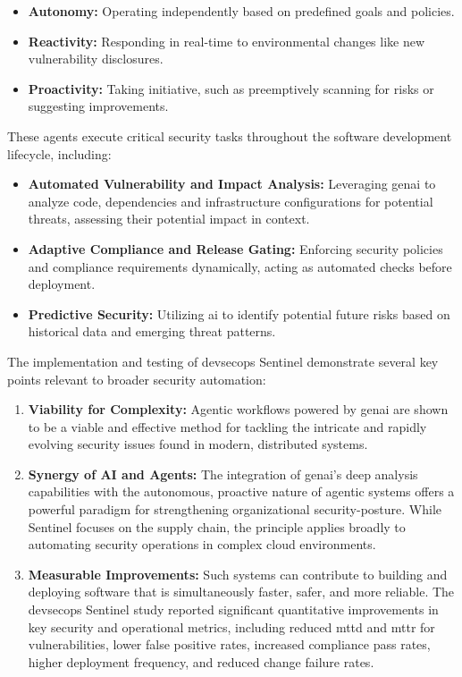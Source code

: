 \begin{itemize}
\item \textbf{Autonomy:} Operating independently based on predefined goals and policies.
\item \textbf{Reactivity:} Responding in real-time to environmental changes like new vulnerability disclosures.
\item \textbf{Proactivity:} Taking initiative, such as preemptively scanning for risks or suggesting improvements\cite{pillala_devsecops_2024}.
\end{itemize}
These agents execute critical security tasks throughout the software development lifecycle, including:
\begin{itemize}
\item \textbf{Automated Vulnerability and Impact Analysis:} Leveraging \gls{genai} to analyze code, dependencies and infrastructure configurations for potential threats, assessing their potential impact in context\cite{pillala_devsecops_2024}.
\item \textbf{Adaptive Compliance and Release Gating:} Enforcing security policies and compliance requirements dynamically, acting as automated checks before deployment\cite{pillala_devsecops_2024}.
\item \textbf{Predictive Security:} Utilizing \gls{ai} to identify potential future risks based on historical data and emerging threat patterns\cite{pillala_devsecops_2024}.
\end{itemize}
The implementation and testing of \gls{devsecops} Sentinel demonstrate several key points relevant to broader security automation:
\begin{enumerate}
\item \textbf{Viability for Complexity:} Agentic workflows powered by \gls{genai} are shown to be a viable and effective method for tackling the intricate and rapidly evolving security issues found in modern, distributed systems\cite{pillala_devsecops_2024}.
\item \textbf{Synergy of AI and Agents:} The integration of \gls{genai}'s deep analysis capabilities with the autonomous, proactive nature of agentic systems offers a powerful paradigm for strengthening organizational \gls{security-posture}\cite{pillala_devsecops_2024}. While Sentinel focuses on the supply chain, the principle applies broadly to automating security operations in complex cloud environments.
\item \textbf{Measurable Improvements:} Such systems can contribute to building and deploying software that is simultaneously faster, safer, and more reliable. The \gls{devsecops} Sentinel study reported significant quantitative improvements in key security and operational metrics, including reduced \gls{mttd} and \gls{mttr} for vulnerabilities, lower false positive rates, increased compliance pass rates, higher deployment frequency, and reduced change failure rates\cite{pillala_devsecops_2024}.
\end{enumerate}

